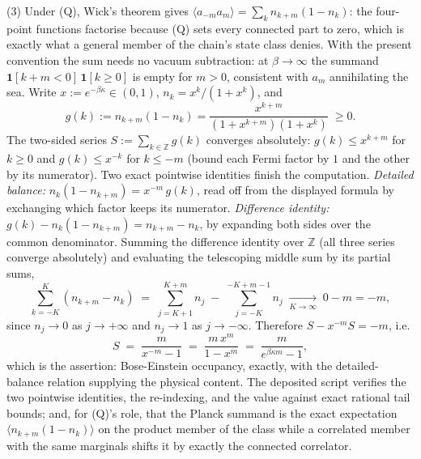 (3) Under (Q), Wick's theorem gives $\langle a_{-m} a_m\rangle = \sum_{k} n_{k+m}(1 - n_k)$: the four-point functions factorise because (Q) sets every connected part to zero, which is exactly what a general member of the chain's state class denies. With the present convention the sum needs no vacuum subtraction: at $\beta \to \infty$ the summand $\mathbf{1}[k + m < 0]\,\mathbf{1}[k \geq 0]$ is empty for $m > 0$, consistent with $a_m$ annihilating the sea. Write $x := e^{-\beta\kappa} \in (0,1)$, $n_k = x^k/(1 + x^k)$, and
\[
g(k) := n_{k+m}(1 - n_k) = \frac{x^{k+m}}{(1 + x^{k+m})(1 + x^k)} \;\geq 0.
\]
The two-sided series $S := \sum_{k \in \mathbb{Z}} g(k)$ converges absolutely: $g(k) \leq x^{k+m}$ for $k \geq 0$ and $g(k) \leq x^{-k}$ for $k \leq -m$ (bound each Fermi factor by $1$ and the other by its numerator). Two exact pointwise identities finish the computation. \emph{Detailed balance:} $n_k(1 - n_{k+m}) = x^{-m}\, g(k)$, read off from the displayed formula by exchanging which factor keeps its numerator. \emph{Difference identity:} $g(k) - n_k(1 - n_{k+m}) = n_{k+m} - n_k$, by expanding both sides over the common denominator. Summing the difference identity over $\mathbb{Z}$ (all three series converge absolutely) and evaluating the telescoping middle sum by its partial sums,
\[
\sum_{k=-K}^{K} (n_{k+m} - n_k) \;=\; \sum_{j=K+1}^{K+m} n_j \;-\; \sum_{j=-K}^{-K+m-1} n_j \;\xrightarrow[K \to \infty]{}\; 0 - m = -m ,
\]
since $n_j \to 0$ as $j \to +\infty$ and $n_j \to 1$ as $j \to -\infty$. Therefore $S - x^{-m} S = -m$, i.e.
\[
S \;=\; \frac{m}{x^{-m} - 1} \;=\; \frac{m\,x^m}{1 - x^m} \;=\; \frac{m}{e^{\beta\kappa m} - 1} ,
\]
which is the assertion: Bose-Einstein occupancy, exactly, with the detailed-balance relation supplying the physical content. The deposited script verifies the two pointwise identities, the re-indexing, and the value against exact rational tail bounds; and, for (Q)'s role, that the Planck summand is the exact expectation $\langle n_{k+m}(1 - n_k)\rangle$ on the product member of the class while a correlated member with the same marginals shifts it by exactly the connected correlator.
